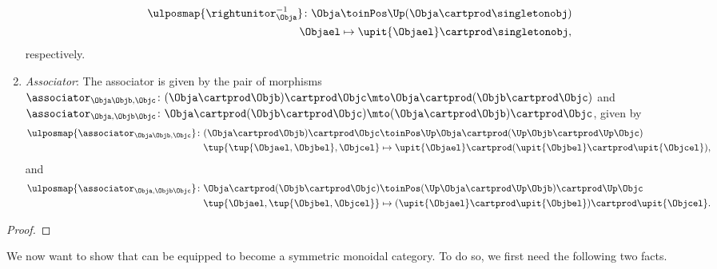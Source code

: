 \begin{lemma}
\begin{enumerate}
\begin{equation}
\begin{aligned}
                      \ulposmap{\rightunitor_{\Obja}^{-1}}\colon \Obja & \toinPos \Up( \Obja \cartprod \singletonobj)       \\
                      \Objael                                          & \mapsto \upit \{\Objael\} \cartprod \singletonobj,
                  \end{aligned}
              \end{equation}
              respectively.
        \item \emph{Associator}: The associator is given by the pair of morphisms~$\associator_{\Obja\Objb,\Objc}\colon (\Obja\cartprod \Objb)\cartprod \Objc \mto \Obja\cartprod ( \Objb \cartprod \Objc)$ and~$\associator_{\Obja,\Objb\Objc}\colon \Obja\cartprod (\Objb\cartprod \Objc) \mto (\Obja\cartprod \Objb) \cartprod \Objc$, given by
              \begin{equation}
                  \begin{aligned}
                      \ulposmap{\associator_{\Obja\Objb,\Objc}}\colon (\Obja\cartprod \Objb)\cartprod \Objc & \toinPos \Up \Obja\cartprod (\Up \Objb \cartprod \Up \Objc)                     \\
                      \tup{\tup{\Objael,\Objbel},\Objcel}                                                   & \mapsto \upit\{\Objael\}\cartprod (\upit\{\Objbel\}\cartprod \upit\{\Objcel\}),
                  \end{aligned}
              \end{equation}
              and
              \begin{equation}
                  \begin{aligned}
                      \ulposmap{\associator_{\Obja,\Objb\Objc}}\colon \Obja\cartprod (\Objb\cartprod \Objc) & \toinPos (\Up \Obja\cartprod \Up \Objb) \cartprod \Up \Objc                     \\
                      \tup{\Objael,\tup{\Objbel,\Objcel}}                                                   & \mapsto (\upit\{\Objael\}\cartprod \upit\{\Objbel\})\cartprod \upit\{\Objcel\}.
                  \end{aligned}
              \end{equation}
    \end{enumerate}
\end{lemma}
\begin{proof}
\end{proof}

We now want to show that \UPos can be equipped to become a symmetric monoidal category.
To do so, we first need the following two facts.

